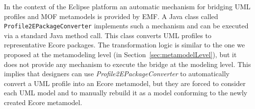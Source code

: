 In the context of the Eclipse platform an automatic mechanism for bridging UML profiles and MOF metamodels is provided by EMF. A Java class called \texttt{Profile2EPackageConverter} implements such a mechanism and  can be executed via a standard Java method call.
This class converts UML profiles to representative Ecore packages. The transformation logic is similar to the one we proposed at the metamodeling level (in Section~\ref{sec:metamodelLevel}), but it does not provide any mechanism to execute the bridge at the modeling level. This implies that designers can use \textit{Profile2EPackageConverter} to automatically convert a UML profile into an Ecore metamodel, but they are forced to consider each UML model and to manually rebuild it as a model conforming to the newly created Ecore metamodel. 